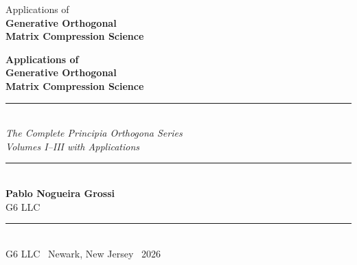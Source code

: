 \documentclass[12pt, oneside]{book}
\theoremstyle{plain}
\theoremstyle{definition}
\theoremstyle{remark}
\begin{document}

\frontmatter

\thispagestyle{empty}
\vspace*{4cm}
\begin{center}
  {\large Applications of}\\[0.5em]
  {\LARGE\bfseries Generative Orthogonal\\[0.3em]
  Matrix Compression Science}
\end{center}
\cleardoublepage

\thispagestyle{empty}
\begin{center}
  \vspace*{1.5cm}
  {\LARGE\bfseries Applications of}\\[0.4em]
  {\Large\bfseries Generative Orthogonal\\[0.3em]
  Matrix Compression Science}\\[1.5em]
  \rule{0.6\textwidth}{0.8pt}\\[1em]
  {\large\itshape The Complete Principia Orthogona Series\\
  Volumes I--III with Applications}\\[2em]
  \rule{0.6\textwidth}{0.4pt}\\[2em]
  {\large\bfseries Pablo Nogueira Grossi}\\[0.5em]
  {\normalsize G6 LLC}\\[4em]
  \vfill
  \rule{0.6\textwidth}{0.8pt}\\[0.5em]
  {\small G6 LLC \textperiodcentered\ Newark, New Jersey \textperiodcentered\ 2026}
\end{center}
\cleardoublepage
\end{document}
